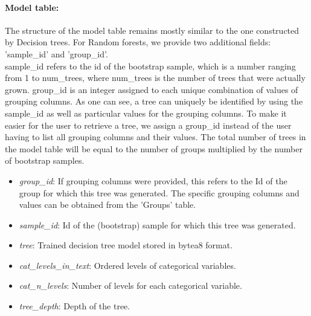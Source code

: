 \paragraph{Model table:}
The structure of the model table remains mostly similar to the one constructed by Decision trees.
For Random forests, we provide two additional fields: 'sample\_id' and 'group\_id'.\\
sample\_id refers to the id of the bootstrap sample, which is a number ranging from 1 to
num\_trees, where num\_trees is the number of trees that were actually grown.
group\_id is an integer assigned to each unique combination of values of grouping columns.
As one can see, a tree can uniquely be identified by using the sample\_id as well as
particular values for the grouping columns. To make it easier for the user to retrieve a tree,
we assign a group\_id instead of the user having to list all grouping columns and their values.
The total number of trees in the model table will be equal to the number of groups multiplied
by the number of bootstrap samples.

\begin{itemize}
    \item \emph{group\_id}: If grouping columns were provided, this refers to the Id of the group
    for which this tree was generated. The specific grouping columns and values can be
    obtained from the 'Groups' table.
    \item \emph{sample\_id}: Id of the (bootstrap) sample for which this tree was generated.
    \item \emph{tree}: Trained decision tree model stored in bytea8 format.
    \item \emph{cat\_levels\_in\_text}: Ordered levels of categorical variables.
    \item \emph{cat\_n\_levels}: Number of levels for each categorical variable.
    \item \emph{tree\_depth}: Depth of the tree.
\end{itemize}

